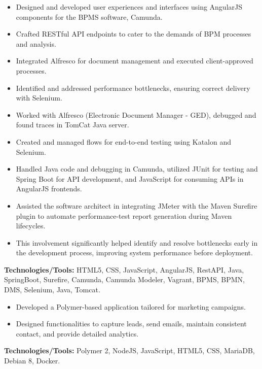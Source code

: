 \documentclass[10pt,a4paper]{altacv}
\begin{document}
\begin{itemize}
    \setlength{\itemindent}{0.5em}
    \item[--] Designed and developed user experiences and interfaces using AngularJS components for the BPMS software, Camunda.
    \item[--] Crafted RESTful API endpoints to cater to the demands of BPM processes and analysis.
    \item[--] Integrated Alfresco for document management and executed client-approved processes.
    \item[--] Identified and addressed performance bottlenecks, ensuring correct delivery with Selenium.
    \item[--] Worked with Alfresco (Electronic Document Manager - GED), debugged and found traces in TomCat Java server.
    \item[--] Created and managed flows for end-to-end testing using Katalon and Selenium.
    \item[--] Handled Java code and debugging in Camunda, utilized JUnit for testing and Spring Boot for API development, and JavaScript for consuming APIs in AngularJS frontends.
    \item[--] Assisted the software architect in integrating JMeter with the Maven Surefire plugin to automate performance-test report generation during Maven lifecycles.
    \item[--] This involvement significantly helped identify and resolve bottlenecks early in the development process, improving system performance before deployment.
\end{itemize}
\textbf{Technologies/Tools:} HTML5, CSS, JavaScript, AngularJS, RestAPI, Java, SpringBoot, Surefire, Camunda, Camunda Modeler, Vagrant, BPMS, BPMN, DMS, Selenium, Java, Tomcat.
\vspace{5mm}

\begin{itemize}
    \setlength{\itemindent}{0.5em}
    \item[--] Developed a Polymer-based application tailored for marketing campaigns.
    \item[--] Designed functionalities to capture leads, send emails, maintain consistent contact, and provide detailed analytics.
\end{itemize}
\textbf{Technologies/Tools:} Polymer 2, NodeJS, JavaScript, HTML5, CSS, MariaDB, Debian 8, Docker.
\vspace{5mm}
\end{document}
